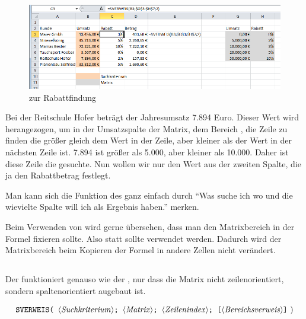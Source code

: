 \pagebreak
	\begin{figure}[H]
		\centering
			\includegraphics[scale=0.7]{images/sverweis_b}
		\caption{ zur Rabattfindung}
		\label{fig:sverweis}
	\end{figure}
Bei der Reitschule Hofer beträgt der Jahresumsatz 7.894 Euro. Dieser Wert wird herangezogen, um in der Umsatzspalte der Matrix, dem Bereich , die Zeile zu finden die größer gleich dem Wert in der Zeile, aber kleiner als der Wert in der nächsten Zeile ist. 7.894 ist größer als 5.000, aber kleiner als 10.000. Daher ist diese Zeile die gesuchte. Nun wollen wir nur den Wert aus der zweiten Spalte, die ja den Rabattbetrag festlegt.




\begin{lightbulbbox}
Man kann sich die Funktion des  ganz einfach durch "`Was suche ich wo und die wievielte Spalte will ich als Ergebnis haben."' merken.
\end{lightbulbbox}


\begin{lightbulbbox}
Beim Verwenden von  wird gerne übersehen, dass man den Matrixbereich in der Formel fixieren sollte. Also statt  sollte  verwendet werden. Dadurch wird der Matrixbereich beim Kopieren der Formel in andere Zellen nicht verändert.
\end{lightbulbbox}


\subsection{}


Der  funktioniert genauso wie der , nur dass die Matrix nicht zeilenorientiert, sondern spaltenorientiert augebaut ist.


$$ \text{\stmt{SVERWEIS( \syntax{Suchkriterium}; \syntax{Matrix}; \syntax{Zeilenindex}; [\syntax{Bereichsverweis}]} )}$$

